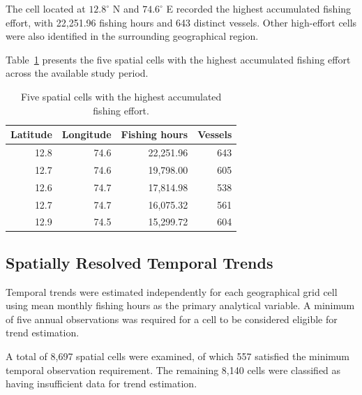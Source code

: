 \documentclass[pdflatex,sn-mathphys-num]{sn-jnl}
\theoremstyle{thmstyleone}
\theoremstyle{thmstyletwo}
\theoremstyle{thmstylethree}
\begin{document}
The cell located at $12.8^\circ$ N and
$74.6^\circ$ E recorded the highest accumulated
fishing effort, with 22,251.96 fishing hours and
643 distinct vessels. Other high-effort cells
were also identified in the surrounding
geographical region.

Table~\ref{tab:top-effort-cells} presents the
five spatial cells with the highest accumulated
fishing effort across the available study period.

\begin{table}[!htbp]
\centering
\caption{Five spatial cells with the highest
accumulated fishing effort.}
\label{tab:top-effort-cells}
\small
\begin{tabular}{rrrr}
\toprule
Latitude & Longitude & Fishing hours & Vessels \\
\midrule
12.8 & 74.6 & 22,251.96 & 643 \\
12.7 & 74.6 & 19,798.00 & 605 \\
12.6 & 74.7 & 17,814.98 & 538 \\
12.7 & 74.7 & 16,075.32 & 561 \\
12.9 & 74.5 & 15,299.72 & 604 \\
\bottomrule
\end{tabular}
\end{table}

\FloatBarrier



\subsection{Spatially Resolved Temporal Trends}
\label{subsec:trend-results}

Temporal trends were estimated independently
for each geographical grid cell using mean
monthly fishing hours as the primary analytical
variable. A minimum of five annual observations
was required for a cell to be considered eligible
for trend estimation.

A total of 8,697 spatial cells were examined,
of which 557 satisfied the minimum temporal
observation requirement. The remaining 8,140
cells were classified as having insufficient
data for trend estimation.


\end{document}
